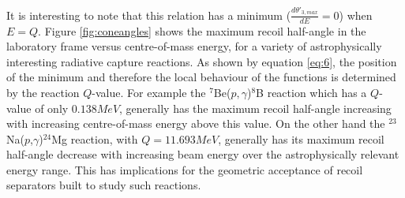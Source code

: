 It is interesting to note that this relation has a minimum ($\frac{d\theta'_{3,max}}{dE}=0$) when $E=Q$. Figure \ref{fig:coneangles} shows the maximum recoil half-angle in the laboratory frame versus centre-of-mass energy, for a variety of astrophysically interesting radiative capture reactions. As shown by equation \ref{eq:6}, the position of the minimum and therefore the local behaviour of the functions is determined by the reaction $Q$-value. For example the $^{7}$Be($p,\gamma$)$^{8}$B reaction which has a $Q$-value of only $0.138 \unit{MeV}$, generally has the maximum recoil half-angle increasing with increasing centre-of-mass energy above this value. On the other hand the $^{23}$Na($p$,$\gamma$)$^{24}$Mg reaction, with $Q=11.693 \unit{MeV}$, generally has its maximum recoil half-angle decrease with increasing beam energy over the astrophysically relevant energy range. This has implications for the geometric acceptance of recoil separators built to study such reactions. 

